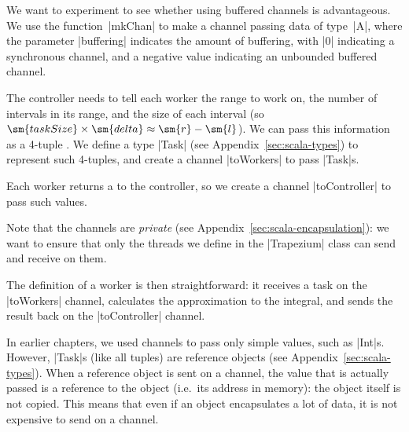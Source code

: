 
We want to experiment to see whether using buffered channels is advantageous.
We use the function~|mkChan| to make a channel passing data of type~|A|, where
the parameter |buffering| indicates the amount of buffering, with |0|
indicating a synchronous channel, and a negative value indicating an unbounded
buffered channel.

The controller needs to tell each worker the range \SCALA{[l,r]} to work on,
the number  of intervals in its range, and the size
 of each interval (so $\sm{taskSize} \times \sm{delta} \approx
\sm{r} - \sm{l}$).  We can pass this information as a 4-tuple .  We define a type |Task| (see
Appendix~\ref{sec:scala-types}) to represent such 4-tuples, and create a
channel |toWorkers| to pass |Task|s.

Each worker returns a  to the controller, so we create a channel
|toController| to pass such values.

Note that the channels are \emph{private} (see
Appendix~\ref{sec:scala-encapsulation}): we want to ensure that only the
threads we define in the |Trapezium| class can send and receive on them.

The definition of a worker is then straightforward: it receives a task on the
|toWorkers| channel, calculates the approximation to the integral, and sends
the result back on the |toController| channel.

In earlier chapters, we used channels to pass only simple values, such as
|Int|s.  However, |Task|s (like all tuples) are reference objects (see
Appendix~\ref{sec:scala-types}).  When a reference object is sent on a channel,
the value that is actually passed is a reference to the object (i.e.~its
address in memory): the object itself is not copied.  This means that even if
an object encapsulates a lot of data, it is not expensive to send on a
channel.


